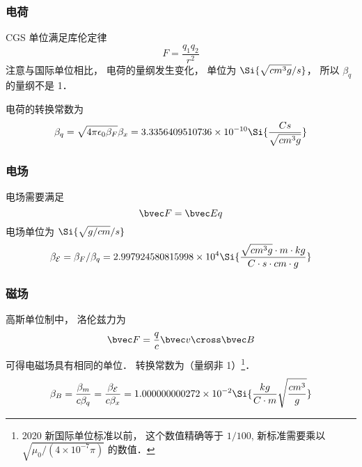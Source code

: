 
\begin{issues}
\issueDraft
\end{issues}


\subsubsection{电荷}
CGS 单位满足库伦定律
\begin{equation}
F = \frac{q_1 q_2}{r^2}
\end{equation}
注意与国际单位相比， 电荷的量纲发生变化， 单位为 $\Si{\sqrt{cm^3 g}/s}$， 所以 $\beta_q$ 的量纲不是 1．

电荷的转换常数为
\begin{equation}
\beta_q = \sqrt{4\pi\epsilon_0\beta_F} \beta_x = 3.3356409510736\times 10^{-10} \Si{\frac{Cs}{\sqrt{cm^3 g}}}
\end{equation}

\subsubsection{电场}
电场需要满足
\begin{equation}
\bvec F = \bvec E q
\end{equation}
电场单位为 $\Si{\sqrt{g/cm}/s}$
\begin{equation}
\beta_{\mathcal E} = \beta_F/\beta_q = 2.997924580815998\times 10^4 \Si{\frac{\sqrt{cm^3 g}\cdot m\cdot kg}{C\cdot s\cdot cm\cdot g}}
\end{equation}

\subsubsection{磁场}
高斯单位制中， 洛伦兹力为
\begin{equation}
\bvec F = \frac{q}{c} \bvec v \cross \bvec B
\end{equation}
可得电磁场具有相同的单位． 转换常数为（量纲非 1）\footnote{2020 新国际单位标准以前， 这个数值精确等于 $1/100$, 新标准需要乘以 $\sqrt{\mu_0/(4\times 10^{-7}\pi)}$ 的数值．}．
\begin{equation}
\beta_B = \frac{\beta_m}{c\beta_q} = \frac{\beta_{\mathcal E}}{c\beta_x} = 1.000000000272\times 10^{-2} \Si{\frac{kg}{C\cdot m}\sqrt{\frac{cm^3}{g}}}
\end{equation}

